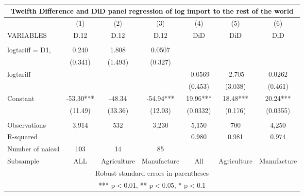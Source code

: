 \begin{tabular}{lcccccc}
\multicolumn{7}{c}{Twelfth Difference and DiD panel regression of log import to the rest of the world} \\ \hline
 & (1) & (2) & (3) & (4) & (5) & (6) \\
VARIABLES & D.12 & D.12 & D.12 & DiD & DiD & DiD \\ \hline
 &  &  &  &  &  &  \\
logtariff = D1, & 0.240 & 1.808 & 0.0507 &  &  &  \\
 & (0.341) & (1.493) & (0.327) &  &  &  \\
logtariff &  &  &  & -0.0569 & -2.705 & 0.0262 \\
 &  &  &  & (0.453) & (3.038) & (0.461) \\
Constant & -53.30*** & -48.34 & -54.94*** & 19.96*** & 18.48*** & 20.24*** \\
 & (11.49) & (33.36) & (12.03) & (0.0332) & (0.176) & (0.0355) \\
 &  &  &  &  &  &  \\
Observations & 3,914 & 532 & 3,230 & 5,150 & 700 & 4,250 \\
R-squared &  &  &  & 0.980 & 0.981 & 0.974 \\
Number of naics4 & 103 & 14 & 85 &  &  &  \\
 Subsample & ALL & Agriculture & Manufacture & All & Agriculture & Manufacture \\ \hline
\multicolumn{7}{c}{ Robust standard errors in parentheses} \\
\multicolumn{7}{c}{ *** p$<$0.01, ** p$<$0.05, * p$<$0.1} \\
\end{tabular}
